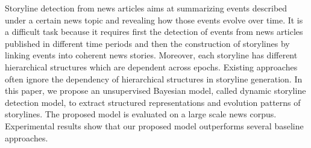 Storyline detection from news articles aims at summarizing events described under a certain news topic and revealing how those events evolve over time. It is a difficult task because it requires first the detection of events from news articles published in different time periods and then the construction of storylines by linking events into coherent news stories. Moreover, each storyline has different hierarchical structures which are dependent across epochs. Existing approaches often ignore the dependency of hierarchical structures in storyline generation. In this paper, we propose an unsupervised Bayesian model, called dynamic storyline detection model, to extract structured representations and evolution patterns of storylines. The proposed model is evaluated on a large scale news corpus. Experimental results show that our proposed model outperforms several baseline approaches.
